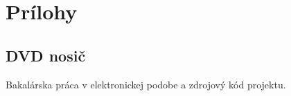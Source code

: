 \chapter*{Prílohy}

\section*{DVD nosič}
Bakalárska práca v elektronickej podobe a zdrojový kód projektu.